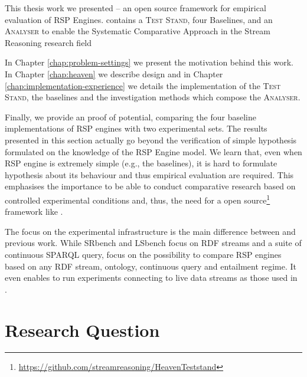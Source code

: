This thesis work we presented \name -- an open source framework for empirical evaluation of RSP Engines. \name contains a \textsc{Test Stand}, four Baselines, and an \textsc{Analyser} to enable the Systematic Comparative Approach in the Stream Reasoning research field

In Chapter \ref{chap:problem-settings} we present the motivation behind this work. In Chapter \ref{chap:heaven} we describe \name design and in Chapter \ref{chap:implementation-experience} we details the implementation of the \textsc{Test Stand}, the baselines and the investigation methods which compose the \textsc{Analyser}.

Finally, we provide an proof of \name potential, comparing the four baseline implementations of RSP engines with two experimental sets. The results presented in this section actually  go beyond the verification of simple hypothesis formulated on the knowledge of the RSP Engine model. We learn that, even when RSP engine is extremely simple (e.g., the baselines), it is hard to formulate  hypothesis about its behaviour and thus empirical evaluation are required. This emphasises the importance to be able to conduct comparative research based on controlled experimental conditions and, thus, the need for a open source\footnote{\url{https://github.com/streamreasoning/HeavenTeststand}} framework like \namens.

The focus on the experimental infrastructure is the main difference between \name and previous work. While SRbench and LSbench focus on RDF streams and a suite of continuous SPARQL query, \name focus on the possibility to compare RSP engines based on any RDF stream, ontology, continuous query and entailment regime. It even enables to run experiments connecting to live data streams as those used in \cite{DBLP:conf/semweb/BalduiniVDTPC13}.	

\section{Research Question}

